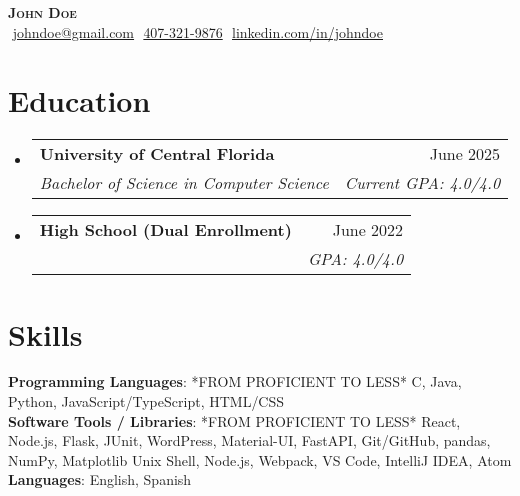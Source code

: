 \documentclass[letterpaper,11pt]{article}
\makeatletter
\newcommand{\resumeSubheading}[4]{
  \vspace{-2pt}\item
    \begin{tabular*}{0.97\textwidth}[t]{l@{\extracolsep{\fill}}r}
      \textbf{#1} & #2 \\
      \textit{\small#3} & \textit{\small #4} \\
    \end{tabular*}\vspace{-7pt}
}
\newcommand{\resumeSubHeadingListStart}{\begin{itemize}[leftmargin=0.15in, label={}]}
\newcommand{\resumeSubHeadingListEnd}{\end{itemize}}
\makeatother
\begin{document}
\begin{flushright}
  \vspace{-4pt}
\end{flushright}

\vspace{-7pt}

\begin{center}
    \textbf{\Huge \scshape John Doe} \\ \vspace{8pt}
    \small 
    \faEnvelope$  $
    \href{mailto:johndoe@gmail.com}
    {\underline{johndoe@gmail.com}}
    \faPhone$  $
    \underline{407-321-9876}
    \faLinkedin$  $
    \href{https://linkedin.com/in/johndoe}{\underline{linkedin.com/in/johndoe}} $  $
\end{center}

\section{Education}
  \resumeSubHeadingListStart
  
    \resumeSubheading
      {University of Central Florida}{June 2025}
      {Bachelor of Science in Computer Science}{Current GPA: 4.0/4.0}
      
    \resumeSubheading
      {High School \footnotesize{(Dual Enrollment)}}{June 2022}
      {}{GPA: 4.0/4.0}

  \resumeSubHeadingListEnd

\section{Skills}
 \begin{itemize}[leftmargin=0.15in, label={}]
    \small{\item{
    
     \textbf{Programming Languages}{: *FROM PROFICIENT TO LESS* C, Java, Python, JavaScript/TypeScript, HTML/CSS} \\
     
     \textbf{Software Tools / Libraries}{: *FROM PROFICIENT TO LESS* React, Node.js, Flask, JUnit, WordPress, Material-UI, FastAPI, Git/GitHub, pandas, NumPy, Matplotlib Unix Shell, Node.js, Webpack, VS Code, IntelliJ IDEA, Atom} \\

     \textbf{Languages}{: English, Spanish} \\
     
    }}
 \end{itemize}
\end{document}
